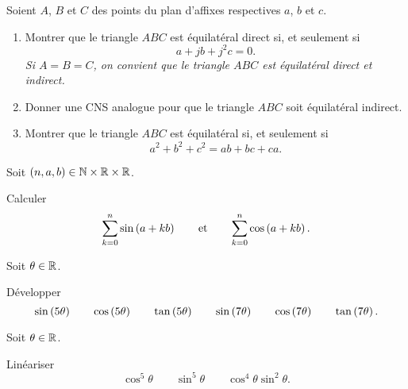\begin{corr}
\end{corr}

\begin{exo}
Soient \(A\), \(B\) et \(C\) des points du plan d'affixes respectives \(a\), \(b\) et \(c\).

\begin{enumerate}
\item Montrer que le triangle \(ABC\) est équilatéral direct si, et seulement si \[a+jb+j^2c=0.\] \textit{\small Si \(A=B=C\), on convient que le triangle \(ABC\) est équilatéral direct et indirect.} \\

\item Donner une CNS analogue pour que le triangle \(ABC\) soit équilatéral indirect. \\

\item Montrer que le triangle \(ABC\) est équilatéral si, et seulement si \[a^2+b^2+c^2=ab+bc+ca.\]
\end{enumerate}
\end{exo}

\begin{corr}
\end{corr}

\begin{exo}
Soit \(\left(n,a,b\right)\in\mathbb{N}\times\mathbb{R}\times\mathbb{R}\).

Calculer \[\sum_{k=0}^{n}\sin\left(a+kb\right)\qquad\text{et}\qquad\sum_{k=0}^{n}\cos\left(a+kb\right).\]
\end{exo}

\begin{corr}
\end{corr}

\begin{exo}
Soit \(\theta\in\mathbb{R}\).

Développer \[\sin\left(5\theta\right)\qquad\cos\left(5\theta\right)\qquad\tan\left(5\theta\right)\qquad\sin\left(7\theta\right)\qquad\cos\left(7\theta\right)\qquad\tan\left(7\theta\right).\]
\end{exo}

\begin{corr}
\end{corr}

\begin{exo}
Soit \(\theta\in\mathbb{R}\).

Linéariser \[\cos^5\theta\qquad\sin^5\theta\qquad\cos^4\theta\sin^2\theta.\]
\end{exo}

